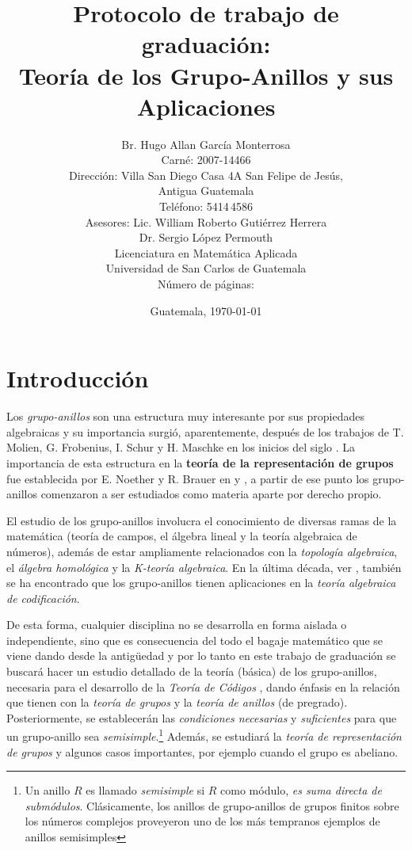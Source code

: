 \documentclass[12pt,letterpaper,titlepage]{article}
\title{Protocolo de trabajo de graduación:\\
Teoría de los Grupo-Anillos y sus Aplicaciones}
\author{Br. Hugo Allan García Monterrosa\\Carné: 2007-14466\\Dirección: Villa San Diego Casa 4A San Felipe de Jesús,\\Antigua Guatemala\\Teléfono: 5414\,4586\\Asesores: Lic. William Roberto Gutiérrez Herrera \\ Dr. Sergio López  Permouth\\Licenciatura en Matemática Aplicada\\Universidad de San Carlos de Guatemala\\Número de páginas: \pageref{fin}}
\date{Guatemala, \today}
\begin{document}
\maketitle
\setcounter{page}{2}
\tableofcontents

\newpage

\section{Introducción}
Los \textit{grupo-anillos} son una estructura muy interesante por sus propiedades algebraicas y su importancia surgió, aparentemente, después de los trabajos de T. Molien, G. Frobenius, I. Schur y H. Maschke en los inicios del siglo . La importancia de esta estructura en la \textbf{teoría de la representación de grupos} fue establecida por E. Noether y R. Brauer en \cite{b10} y \cite{b11}, a partir de ese punto los grupo-anillos comenzaron a ser estudiados como materia aparte por derecho propio. \bigskip

El estudio de los grupo-anillos involucra el conocimiento de diversas ramas de la matemática (teoría de campos, el álgebra lineal y la teoría algebraica de números), además de estar ampliamente relacionados con la \textit{topología algebraica}, el \textit{álgebra homológica} y la \textit{K-teoría algebraica}. En la última década, ver \cite{b12}, también se ha encontrado que los grupo-anillos tienen aplicaciones en la \textit{teoría algebraica de codificación}. \bigskip



De esta forma, cualquier disciplina no se desarrolla en forma aislada o independiente, sino que es consecuencia del todo el bagaje matemático que se viene dando desde la antigüedad y por lo tanto en este trabajo de graduación se buscará hacer un estudio detallado de la teoría (básica) de los grupo-anillos, necesaria para el desarrollo de la \textit{Teoría de Códigos} , dando énfasis en la relación que tienen con la \textit{teoría de grupos} y la \textit{teoría de anillos} (de pregrado). Posteriormente, se establecerán las \textsl{condiciones necesarias} y \textsl{suficientes} para que un grupo-anillo sea \textit{semisimple}.\footnote{Un anillo $R$ es llamado \textit{semisimple} si $R$ como módulo, \textit{es suma directa de submódulos}. Clásicamente, los anillos de grupo-anillos de grupos finitos sobre los números complejos proveyeron uno
de los más tempranos ejemplos de anillos semisimples} Además, se estudiará  la \textit{teoría de representación de grupos} y algunos casos importantes, por ejemplo cuando el grupo es abeliano. \bigskip
\end{document}

